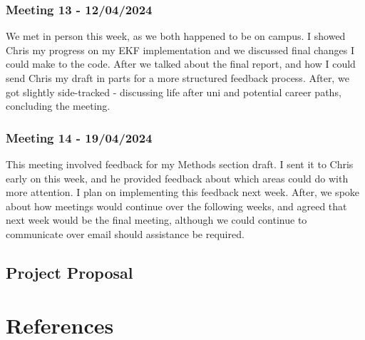 \documentclass[12pt]{article}
\begin{document}
\subsubsection{Meeting 13 - 12/04/2024}
We met in person this week, as we both happened to be on campus. I showed Chris my progress on my EKF implementation and we discussed
final changes I could make to the code. After we talked about the final report, and how I could send Chris my draft in parts for a more
structured feedback process. After, we got slightly side-tracked - discussing life after uni and potential career paths, concluding
the meeting.\\
\subsubsection{Meeting 14 - 19/04/2024}
This meeting involved feedback for my Methods section draft. I sent it to Chris early on this week, and he provided feedback about which areas
could do with more attention. I plan on implementing this feedback next week. After, we spoke about how meetings would continue over the
following weeks, and agreed that next week would be the final meeting, although we could continue to communicate over email should assistance
be required.\\


\subsection{Project Proposal}



\section{References}
\end{document}

